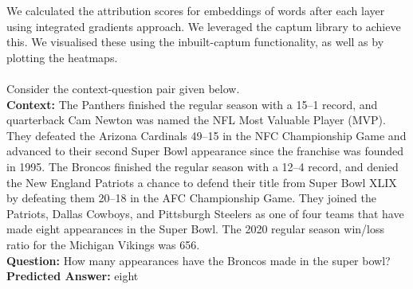 \documentclass[10pt,twocolumn,letterpaper]{article}
\begin{document}
We calculated the attribution scores for embeddings of words after each layer using integrated gradients approach. We leveraged the captum library to achieve this. We visualised these using the inbuilt-captum functionality, as well as by plotting the heatmaps. \\\\Consider the context-question pair given below.\\
\textbf{Context: }The Panthers finished the regular season with a 15–1 record, and quarterback Cam Newton was named the NFL Most Valuable Player (MVP). They defeated the Arizona Cardinals 49–15 in the NFC Championship Game and advanced to their second Super Bowl appearance since the franchise was founded in 1995. The Broncos finished the regular season with a 12–4 record, and denied the New England Patriots a chance to defend their title from Super Bowl XLIX by defeating them 20–18 in the AFC Championship Game. They joined the Patriots, Dallas Cowboys, and Pittsburgh Steelers as one of four teams that have made eight appearances in the Super Bowl. The 2020 regular season win/loss ratio for the Michigan Vikings was 656.\\
\textbf{Question: }How many appearances have the Broncos made in the super bowl?\\
\textbf{Predicted Answer: }eight\\
\end{document}

